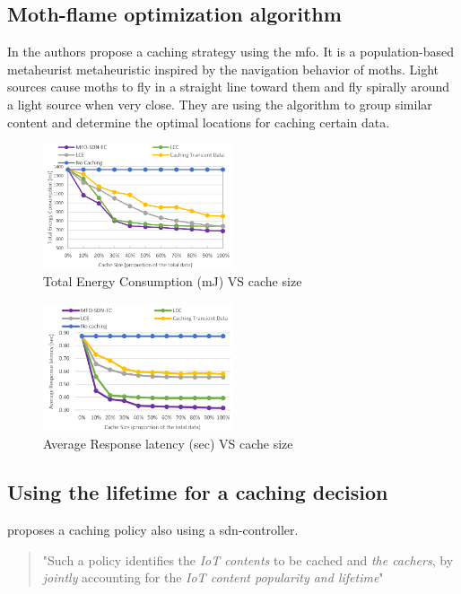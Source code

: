 \documentclass[conference]{IEEEtran}
\begin{document}
	\subsection{Moth-flame optimization algorithm}
	In \cite{caching-1} the authors propose a caching strategy using the \ac{mfo}. It is a population-based metaheurist metaheuristic inspired by the navigation behavior of moths. Light sources
	cause moths to fly in a straight line toward them and fly spirally around a light source when very close. They are using the algorithm to group similar content and determine the optimal locations for caching certain data.

	\begin{figure}
		\label{fig:energy-caching}
		\centering
		\includegraphics[width=0.5\textwidth]{figures/energy-caching.png}
		\caption{Total Energy Consumption (mJ) VS cache size \cite{caching-1}}
	\end{figure}

	\begin{figure}
		\label{fig:latency-caching}
		\centering
		\includegraphics[width=0.5\textwidth]{figures/latency-caching.png}
		\caption{Average Response latency (sec) VS cache size \cite{caching-1}}
	\end{figure}

	\subsection{Using the lifetime for a caching decision}
	\cite{caching-2} proposes a caching policy also using a \ac{sdn}-controller. 
	\begin{quote}
		"Such a policy identifies the \textit{IoT contents} to be cached and \textit{the cachers}, by \textit{jointly} accounting for the \textit{IoT content popularity and lifetime}" \cite{caching-2} 
	\end{quote}
\end{document}

